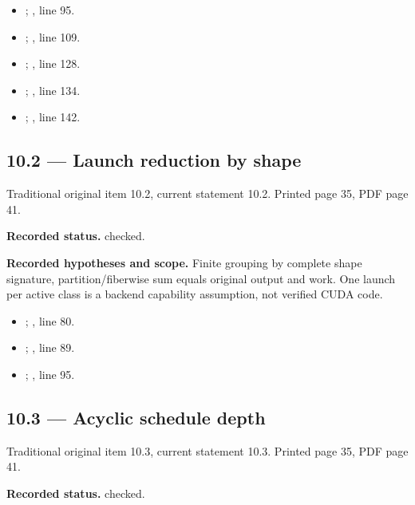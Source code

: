 \begin{itemize}
\item {}; , line 95.
\item {}; , line 109.
\item {}; , line 128.
\item {}; , line 134.
\item {}; , line 142.
\end{itemize}
\subsection{10.2 — Launch reduction by shape}
\label{result:10.2}
{\footnotesize\color{muted}Traditional original item 10.2, current statement 10.2. Printed page 35, PDF page 41.}\par
\textbf{Recorded status.} checked.

\textbf{Recorded hypotheses and scope.} Finite grouping by complete shape signature, partition/fiberwise sum equals original output and work. One launch per active class is a backend capability assumption, not verified CUDA code.

\begin{itemize}
\item {}; , line 80.
\item {}; , line 89.
\item {}; , line 95.
\end{itemize}
\subsection{10.3 — Acyclic schedule depth}
\label{result:10.3}
{\footnotesize\color{muted}Traditional original item 10.3, current statement 10.3. Printed page 35, PDF page 41.}\par
\textbf{Recorded status.} checked.

